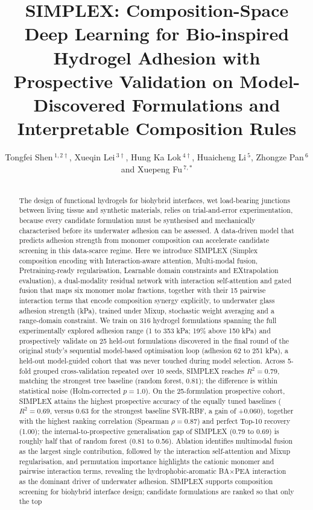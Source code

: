 \documentclass[utf8]{FrontiersinHarvard}
\def\firstAuthorLast{Shen, Lei, Hung, Li, Pan and Fu {et~al.}}
\def\Authors{Tongfei Shen\,$^{1,2\dagger}$, Xueqin Lei\,$^{3\dagger}$, Hung Ka Lok\,$^{4\dagger}$, Huaicheng Li\,$^{5}$, Zhongze Pan\,$^{6}$ and Xuepeng Fu\,$^{7,*}$}
\begin{document}
\onecolumn
{}

\title[SIMPLEX]{SIMPLEX: Composition-Space Deep Learning for Bio-inspired Hydrogel Adhesion with Prospective Validation on Model-Discovered Formulations and Interpretable Composition Rules}

\author[\firstAuthorLast ]{\Authors}
\address{}
\correspondance{}
\extraAuth{}
\maketitle

\begin{abstract}
\section{}
The design of functional hydrogels for biohybrid interfaces, wet load-bearing junctions between living tissue and synthetic materials, relies on trial-and-error experimentation, because every candidate formulation must be synthesised and mechanically characterised before its underwater adhesion can be assessed. A data-driven model that predicts adhesion strength from monomer composition can accelerate candidate screening in this data-scarce regime. Here we introduce SIMPLEX (Simplex composition encoding with Interaction-aware attention, Multi-modal fusion, Pretraining-ready regularisation, Learnable domain constraints and EXtrapolation evaluation), a dual-modality residual network with interaction self-attention and gated fusion that maps six monomer molar fractions, together with their 15 pairwise interaction terms that encode composition synergy explicitly, to underwater glass adhesion strength (kPa), trained under Mixup, stochastic weight averaging and a range-domain constraint. We train on 316 hydrogel formulations spanning the full experimentally explored adhesion range (1 to 353 kPa; 19\% above 150 kPa) and prospectively validate on 25 held-out formulations discovered in the final round of the original study's sequential model-based optimisation loop (adhesion 62 to 251 kPa), a held-out model-guided cohort that was never touched during model selection. Across 5-fold grouped cross-validation repeated over 10 seeds, SIMPLEX reaches $R^2 = 0.79$, matching the strongest tree baseline (random forest, $0.81$); the difference is within statistical noise (Holm-corrected $p = 1.0$). On the 25-formulation prospective cohort, SIMPLEX attains the highest prospective accuracy of the equally tuned baselines ($R^2 = 0.69$, versus 0.63 for the strongest baseline SVR-RBF, a gain of +0.060), together with the highest ranking correlation (Spearman $\rho = 0.87$) and perfect Top-10 recovery (1.00); the internal-to-prospective generalisation gap of SIMPLEX (0.79 to 0.69) is roughly half that of random forest (0.81 to 0.56). Ablation identifies multimodal fusion as the largest single contribution, followed by the interaction self-attention and Mixup regularisation, and permutation importance highlights the cationic monomer and pairwise interaction terms, revealing the hydrophobic-aromatic BA$\times$PEA interaction as the dominant driver of underwater adhesion. SIMPLEX supports composition screening for biohybrid interface design; candidate formulations are ranked so that only the top 
\end{abstract}
\end{document}
